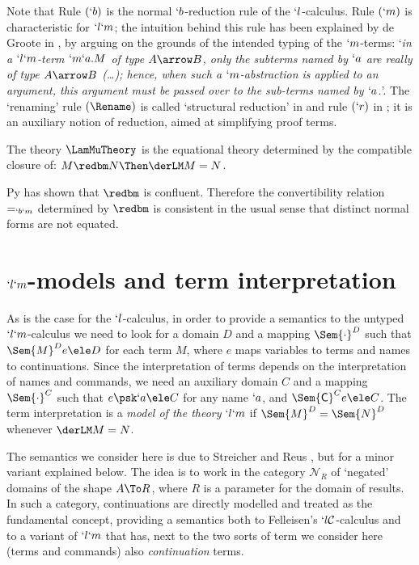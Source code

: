 \documentclass{lmcs}
\begin{document}
Note that Rule $(`b)$ is the normal $`b$-reduction rule of the $`l$-calculus. 
Rule $(`m)$ is characteristic for $`l`m$; the intuition behind this rule has been explained by de Groote in \cite{deGroote'94}, by arguing on the grounds of the intended typing of the $`m$-terms: `\emph{in a $`l`m$-term $`m`a.M$ of type $A\arrow B$, only the subterms named by $`a$ are \emph{really} of type $A\arrow B$ (\ldots); hence, when such a $`m$-abstraction is applied to an argument, this argument must be passed over to the sub-terms named by $`a$.}'. 
The `renaming' rule $(\Rename)$ is called `structural reduction' in \cite{Parigot'92} and rule $(`r)$ in \cite{Py-PhD'98}; it is an auxiliary notion of reduction, aimed at simplifying proof terms.

 \begin{defi} \label{def:theories}
The theory $ \LamMuTheory$ is the equational theory determined by the compatible closure of: $M \redbm N \Then \derLM M = N $.
 \end{defi}

Py \cite{Py-PhD'98} has shown that %
$ \redbm$ is confluent.
Therefore the convertibility relation $=_{`b`m}$ determined by $ \redbm$ is consistent in the usual sense that distinct normal forms are not equated.

 \section{$`l`m$-models and term interpretation} \label{sec:semantics}

As is the case for the $`l$-calculus, in order to provide a semantics to the untyped $`l`m$-calculus we need to look for a domain $D$ and a mapping $\Sem{ \cdot}^D$ such that $\Sem{ M }^D{ e } \ele D$ for each term $M$, where $e$ maps variables to terms and names to continuations. 
Since the interpretation of terms depends on the interpretation of names and commands, we need an auxiliary domain $C$ and a mapping $\Sem{ \cdot}^C$ such that $e \psk `a \ele C$ for any name $`a$, and $\Sem{ \Cmd}^C{ e } \ele C$. The term interpretation is a \emph{model of the theory} $`l`m$ if $\Sem{ M }^D = \Sem{ N }^D$ whenever $\derLM M = N$.

The semantics we consider here is due to Streicher and Reus \cite{Streicher-Reus'98}, but for a minor variant explained below.
The idea is to work in the category ${\mathcal N}_R$ of `negated' domains of the shape $A\To R$, where $R$ is a parameter for the domain of results.
In such a category, continuations are directly modelled and treated as the fundamental concept, providing a semantics both to Felleisen's $ `l{\mathcal C}$-calculus and to a variant of $ `l`m$ that has, next to the two sorts of term we consider here (terms and commands) also \emph{continuation} terms.
\end{document}
